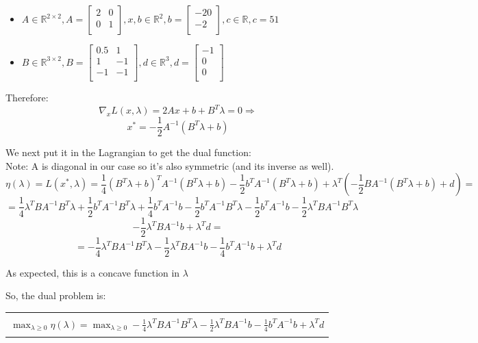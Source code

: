 \documentclass[12pt]{article}
\newcommand{\rectres}[1]{
\begin{center}
\begin{tabular}{ |c| }
\hline
\\
 #1\\
 \\
\hline
\end{tabular}
\end{center}
}
\begin{document}
\begin{itemize}
  \item $A \in \mathbb{R}^{2 \times 2}, A = \begin{bmatrix}
               2 & 0 \\
               0 & 1 \\
  \end{bmatrix}, x,b \in \mathbb{R}^{2}, b = \begin{bmatrix}   -20 \\ -2\\ \end{bmatrix}, c \in \mathbb{R}, c= 51$ 
  \item $B \in \mathbb{R}^{3 \times 2}, B = \begin{bmatrix}
               0.5 & 1 \\
               1 & -1 \\
               -1 & -1 \\
  \end{bmatrix}, d \in \mathbb{R}^{3}, d = \begin{bmatrix}   -1 \\ 0\\ 0\\\end{bmatrix}$
\end{itemize}

Therefore:\\

$$\nabla_x L(x,\lambda) = 2Ax + b + B^T\lambda = 0 \Rightarrow$$
$$ x^* = -\frac{1}{2}A^{-1}(B^T\lambda + b)$$


We next put it in the Lagrangian to get the dual function:\\
Note: A is diagonal in our case so it's also symmetric (and its inverse as well).\\

$$\eta(\lambda) = L(x^*,\lambda) = \frac{1}{4}(B^T\lambda + b)^TA^{-1}(B^T\lambda + b) -\frac{1}{2}b^TA^{-1}(B^T\lambda + b) + \lambda^T (-\frac{1}{2}BA^{-1}(B^T\lambda + b) + d)=$$
$$=\frac{1}{4}\lambda^TBA^{-1}B^T\lambda+\frac{1}{2}b^TA^{-1}B^T\lambda+\frac{1}{4}b^TA^{-1}b-\frac{1}{2}b^TA^{-1}B^T\lambda-\frac{1}{2}b^TA^{-1}b-\frac{1}{2}\lambda^TBA^{-1}B^T\lambda$$
$$-\frac{1}{2}\lambda^TBA^{-1}b + \lambda^Td=$$
$$=-\frac{1}{4}\lambda^TBA^{-1}B^T\lambda -\frac{1}{2}\lambda^TBA^{-1}b-\frac{1}{4}b^TA^{-1}b + \lambda^Td $$

As expected, this is a concave function in $\lambda$

So, the dual problem is:
\rectres{$\max_{\lambda \geq 0} \eta(\lambda)=\max_{\lambda \geq 0}-\frac{1}{4}\lambda^TBA^{-1}B^T\lambda -\frac{1}{2}\lambda^TBA^{-1}b-\frac{1}{4}b^TA^{-1}b + \lambda^Td$}
\end{document}
